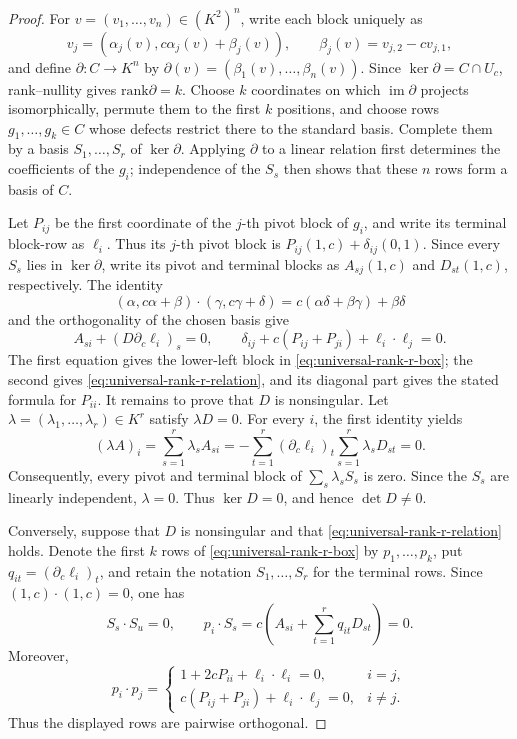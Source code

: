 \documentclass[12pt]{article}
\newcommand{\rank}{\mathrm{rank}}
\begin{document}
\begin{proof}
For \(v=(v_1,\ldots,v_n)\in(K^2)^n\), write each block uniquely as
\[
 v_j=(\alpha_j(v),c\alpha_j(v)+\beta_j(v)),\qquad
 \beta_j(v)=v_{j,2}-cv_{j,1},
\]
and define \(\partial:C\to K^n\) by
\(\partial(v)=(\beta_1(v),\ldots,\beta_n(v))\).  Since
\(\ker\partial=C\cap U_c\), rank--nullity gives
\(\rank\partial=k\).  Choose \(k\) coordinates on which
\(\operatorname{im}\partial\) projects isomorphically, permute them to the
first \(k\) positions, and choose rows \(g_1,\ldots,g_k\in C\) whose defects
restrict there to the standard basis.  Complete them by a basis
\(S_1,\ldots,S_r\) of \(\ker\partial\).  Applying \(\partial\) to a linear
relation first determines the coefficients of the \(g_i\); independence of
the \(S_s\) then shows that these \(n\) rows form a basis of \(C\).

Let \(P_{ij}\) be the first coordinate of the \(j\)-th pivot block of
\(g_i\), and write its terminal block-row as \(\ell_i\).  Thus its
\(j\)-th pivot block is
\(P_{ij}(1,c)+\delta_{ij}(0,1)\).  Since every \(S_s\) lies in
\(\ker\partial\), write its pivot and terminal blocks as
\(A_{sj}(1,c)\) and \(D_{st}(1,c)\), respectively.  The identity
\[
 (\alpha,c\alpha+\beta)\cdot(\gamma,c\gamma+\delta)
   =c(\alpha\delta+\beta\gamma)+\beta\delta
\]
and the orthogonality of the chosen basis give
\[
 A_{si}+(D\partial_c\ell_i)_s=0,
\qquad
 \delta_{ij}+c(P_{ij}+P_{ji})+\ell_i\cdot\ell_j=0.
\]
The first equation gives the lower-left block in
\eqref{eq:universal-rank-r-box}; the second gives
\eqref{eq:universal-rank-r-relation}, and its diagonal part gives the stated
formula for \(P_{ii}\).  It remains to prove that \(D\) is nonsingular.
Let \(\lambda=(\lambda_1,\ldots,\lambda_r)\in K^r\) satisfy
\(\lambda D=0\).  For every \(i\), the first identity yields
\[
 (\lambda A)_i
   =\sum_{s=1}^r\lambda_sA_{si}
   =-\sum_{t=1}^r(\partial_c\ell_i)_t
                    \sum_{s=1}^r\lambda_sD_{st}=0.
\]
Consequently, every pivot and terminal block of
\(\sum_s\lambda_sS_s\) is zero.  Since the \(S_s\) are linearly
independent, \(\lambda=0\).  Thus \(\ker D=0\), and hence
\(\det D\ne0\).

Conversely, suppose that \(D\) is nonsingular and that
\eqref{eq:universal-rank-r-relation} holds.  Denote the first \(k\) rows of
\eqref{eq:universal-rank-r-box} by \(p_1,\ldots,p_k\), put
\(q_{it}=(\partial_c\ell_i)_t\), and retain the notation
\(S_1,\ldots,S_r\) for the terminal rows.  Since
\((1,c)\cdot(1,c)=0\), one has
\[
 S_s\cdot S_u=0,
 \qquad
 p_i\cdot S_s
   =c\left(A_{si}+\sum_{t=1}^r q_{it}D_{st}\right)=0.
\]
Moreover,
\[
 p_i\cdot p_j=
 \begin{cases}
  1+2cP_{ii}+\ell_i\cdot\ell_i=0,&i=j,\\
  c(P_{ij}+P_{ji})+\ell_i\cdot\ell_j=0,&i\ne j.
 \end{cases}
\]
Thus the displayed rows are pairwise orthogonal.


\end{proof}
\end{document}
